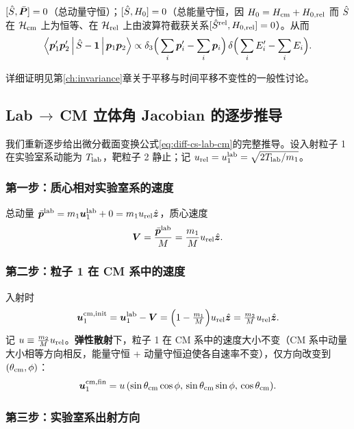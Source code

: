 \begin{corollary}[守恒律]\label{cor:2P-conservation}
  $[\hat{S},\bar{\bm{P}}]=0$（总动量守恒）；$[\hat{S},H_0]=0$（总能量守恒，因 $H_0=H_{\rm cm}+H_{0,\rm rel}$ 而 $\hat{S}$ 在 $\mathcal{H}_{\rm cm}$ 上为恒等、在 $\mathcal{H}_{\rm rel}$ 上由波算符截获关系$[\hat{S}^{\rm rel},H_{0,\rm rel}]=0$）。从而
  \[
    \left\langle \bm{p}_1'\bm{p}_2' \,\middle|\, \hat{S}-\mathbf{1} \,\middle|\, \bm{p}_1\bm{p}_2 \right\rangle
    \propto \delta_3\Big(\sum_i\bm{p}_i'-\sum_i\bm{p}_i\Big)\,\delta\Big(\sum_i E_i'-\sum_i E_i\Big).
  \]
\end{corollary}

详细证明见第\ref{ch:invariance}章关于平移与时间平移不变性的一般性讨论。

\subsection{Lab\,$\to$\,CM 立体角 Jacobian 的逐步推导}\label{sec:2P-jacobian-detailed}

我们重新逐步给出微分截面变换公式\eqref{eq:diff-cs-lab-cm}的完整推导。设入射粒子 1 在实验室系动能为 $T_{\rm lab}$，靶粒子 2 静止；记 $u_{\rm rel}=u_1^{\rm lab}=\sqrt{2T_{\rm lab}/m_1}$。

\subsubsection*{第一步：质心相对实验室系的速度}

总动量 $\bar{\bm{p}}^{\rm lab}=m_1\bm{u}_1^{\rm lab}+0=m_1 u_{\rm rel}\hat{\bm{z}}$，质心速度
\[
  \bm{V} = \frac{\bar{\bm{p}}^{\rm lab}}{M} = \frac{m_1}{M}u_{\rm rel}\hat{\bm{z}}.
\]

\subsubsection*{第二步：粒子 1 在 CM 系中的速度}

入射时
\[
  \bm{u}_1^{\rm cm,init} = \bm{u}_1^{\rm lab}-\bm{V} = \Big(1-\tfrac{m_1}{M}\Big)u_{\rm rel}\hat{\bm{z}} = \tfrac{m_2}{M}u_{\rm rel}\hat{\bm{z}}.
\]
记 $u\equiv\frac{m_2}{M}u_{\rm rel}$。\textbf{弹性散射}下，粒子 1 在 CM 系中的速度大小不变（CM 系中动量大小相等方向相反，能量守恒 + 动量守恒迫使各自速率不变），仅方向改变到 $(\theta_{\rm cm},\phi)$：
\[
  \bm{u}_1^{\rm cm,fin} = u\,(\sin\theta_{\rm cm}\cos\phi,\,\sin\theta_{\rm cm}\sin\phi,\,\cos\theta_{\rm cm}).
\]

\subsubsection*{第三步：实验室系出射方向}

